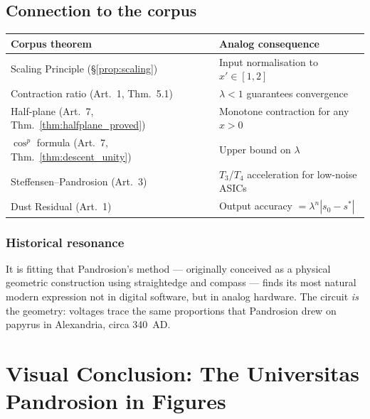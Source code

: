 \documentclass[10pt,a4paper,oneside]{book}
\theoremstyle{definition}
\theoremstyle{remark}
\begin{document}
\section{Connection to the corpus}

\begin{center}
\renewcommand{\arraystretch}{1.3}
\begin{tabular}{ll}
\toprule
\textbf{Corpus theorem} & \textbf{Analog consequence} \\
\midrule
Scaling Principle (\S\ref{prop:scaling}) & Input normalisation to $x' \in [1, 2]$ \\
Contraction ratio (Art.~1, Thm.~5.1) & $\lambda < 1$ guarantees convergence \\
Half-plane (Art.~7, Thm.~\ref{thm:halfplane_proved}) & Monotone contraction for any $x > 0$ \\
$\cos^p$ formula (Art.~7, Thm.~\ref{thm:descent_unity}) & Upper bound on $\lambda$ \\
Steffensen--Pandrosion (Art.~3) & $T_3$/$T_4$ acceleration for low-noise ASICs \\
Dust Residual (Art.~1) & Output accuracy $= \lambda^n |s_0 - s^*|$ \\
\bottomrule
\end{tabular}
\end{center}

\subsection{Historical resonance}

It is fitting that Pandrosion's method --- originally conceived as a physical geometric construction using straightedge and compass --- finds its most natural modern expression not in digital software, but in analog hardware.  The circuit \emph{is} the geometry: voltages trace the same proportions that Pandrosion drew on papyrus in Alexandria, circa 340~AD.



\chapter*{Visual Conclusion: The Universitas Pandrosion in Figures}
\end{document}
